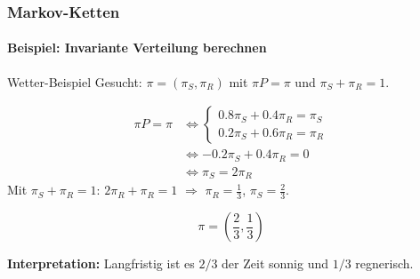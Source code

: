 \documentclass{beamer}
\begin{document}

\begin{frame}
    \frametitle{Markov-Ketten}
\framesubtitle{Beispiel: Invariante Verteilung berechnen}
    \begin{block}{Wetter-Beispiel}
Gesucht: $\pi = (\pi_S, \pi_R)$ mit $\pi P = \pi$ und $\pi_S + \pi_R = 1$.
\end{block}
\begin{align*}
\pi P = \pi &\Leftrightarrow \begin{cases} 0.8 \pi_S + 0.4 \pi_R = \pi_S \\ 0.2 \pi_S + 0.6 \pi_R = \pi_R \end{cases} \\
&\Leftrightarrow -0.2 \pi_S + 0.4 \pi_R = 0 \\
&\Leftrightarrow \pi_S = 2 \pi_R
\end{align*}
Mit $\pi_S + \pi_R = 1$: \quad $2\pi_R + \pi_R = 1$ \quad $\Rightarrow$ \quad $\pi_R = \frac{1}{3}$, \; $\pi_S = \frac{2}{3}$.

\[
\boxed{\pi = \left(\frac{2}{3}, \frac{1}{3}\right)}
\]

\textbf{Interpretation:} Langfristig ist es $2/3$ der Zeit sonnig und $1/3$ regnerisch.
 \end{frame}


\end{document}
